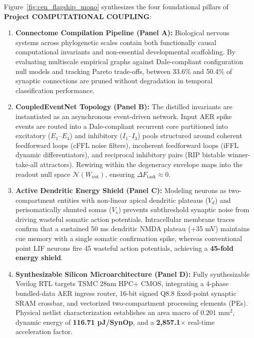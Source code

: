 \documentclass[11pt,letterpaper]{report}
\begin{document}
Figure~\ref{fig:cen_flagship_mono} synthesizes the four foundational pillars of \textbf{Project COMPUTATIONAL COUPLING}:
\begin{enumerate}[leftmargin=*]
    \item \textbf{Connectome Compilation Pipeline (Panel A):} Biological nervous systems across phylogenetic scales contain both functionally causal computational invariants and non-essential developmental scaffolding. By evaluating multiscale empirical graphs against Dale-compliant configuration null models and tracking Pareto trade-offs, between 33.6\% and 50.4\% of synaptic connections are pruned without degradation in temporal classification performance.
    \item \textbf{CoupledEventNet Topology (Panel B):} The distilled invariants are instantiated as an asynchronous event-driven network. Input AER spike events are routed into a Dale-compliant recurrent core partitioned into excitatory ($E_1\text{--}E_4$) and inhibitory ($I_1\text{--}I_3$) pools structured around coherent feedforward loops (cFFL noise filters), incoherent feedforward loops (iFFL dynamic differentiators), and reciprocal inhibitory pairs (RIP bistable winner-take-all attractors). Rewiring within the degeneracy envelope maps into the readout null space $\mathcal{N}(W_{\mathrm{out}})$, ensuring $\Delta F_{\mathrm{task}} \approx 0$.
    \item \textbf{Active Dendritic Energy Shield (Panel C):} Modeling neurons as two-compartment entities with non-linear apical dendritic plateaus ($V_d$) and perisomatically shunted somas ($V_s$) prevents subthreshold synaptic noise from driving wasteful somatic action potentials. Intracellular membrane traces confirm that a sustained 50 ms dendritic NMDA plateau (+35 mV) maintains cue memory with a single somatic confirmation spike, whereas conventional point LIF neurons fire 45 wasteful action potentials, achieving a \textbf{45-fold energy shield}.
    \item \textbf{Synthesizable Silicon Microarchitecture (Panel D):} Fully synthesizable Verilog RTL targets TSMC 28nm HPC+ CMOS, integrating a 4-phase bundled-data AER ingress router, 16-bit signed Q8.8 fixed-point synaptic SRAM crossbar, and vectorized two-compartment processing elements (PEs). Physical netlist characterization establishes an area macro of $0.201\text{ mm}^2$, dynamic energy of \textbf{116.71 pJ/SynOp}, and a \textbf{2,857.1$\times$} real-time acceleration factor.
\end{enumerate}
\end{document}
